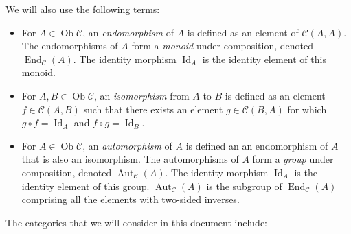 We will also use the following terms:

\begin{itemize}
\item For $A \in \operatorname{Ob}\mathcal{C}$, an {\em endomorphism}
  of $A$ is defined as an element of $\mathcal{C}(A,A)$. The
  endomorphisms of $A$ form a {\em monoid} under composition, denoted
  $\operatorname{End}_{\mathcal{C}}(A)$. The identity morphism
  $\operatorname{Id}_A$ is the identity element of this monoid.
\item For $A,B \in \operatorname{Ob}\mathcal{C}$, an {\em isomorphism}
  from $A$ to $B$ is defined as an element $f \in \mathcal{C}(A,B)$
  such that there exists an element $g \in \mathcal{C}(B,A)$ for which
  $g \circ f = \operatorname{Id}_A$ and $f \circ g =
  \operatorname{Id}_B$.
\item For $A \in \operatorname{Ob}\mathcal{C}$, an {\em automorphism}
  of $A$ is defined an an endomorphism of $A$ that is also an
  isomorphism. The automorphisms of $A$ form a {\em group} under
  composition, denoted $\operatorname{Aut}_{\mathcal{C}}(A)$. The
  identity morphism $\operatorname{Id}_A$ is the identity element of
  this group. $\operatorname{Aut}_{\mathcal{C}}(A)$ is the subgroup of
  $\operatorname{End}_{\mathcal{C}}(A)$ comprising all the elements
  with two-sided inverses.
\end{itemize}

The categories that we will consider in this document include:

